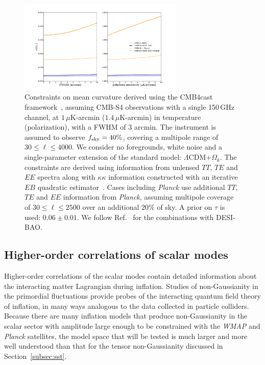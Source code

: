 \begin{figure}[h!]
\centering \includegraphics[width=0.70\textwidth]{Inflation/OmK_vs_FWHM_or_uK_arcmin.pdf}
\caption{Constraints on mean curvature derived using the CMB4cast framework~\cite{Errard:2015cxa}, assuming CMB-S4 observations with a single 150\,GHz channel, at $1\,\mu$K-arcmin ($1.4\,\mu$K-arcmin) in temperature (polarization), with a FWHM of 3 arcmin. The instrument is assumed to observe $f_{\rm sky} = 40\%$, covering a multipole range of $30\leq\ell\leq 4000$.
We consider no foregrounds, white noise and a single-parameter extension of the standard model: $\Lambda$CDM+$\Omega_k$. 
The constraints are derived using information from unlensed $TT$, $TE$ and $EE$ spectra along with $\kappa\kappa$ information constructed with an iterative $EB$ quadratic estimator~\cite{Hirata:2002jy,Smith:2010gu}. Cases including {\it Planck\/} use additional $TT$, $TE$ and $EE$ information from {\it Planck}, assuming multipole coverage of $30\leq\ell\leq 2500$ over an additional $20\%$ of sky. A prior on $\tau$ is used: $0.06\pm0.01$. We follow Ref.~\cite{Wu:2014hta} for the combinations with DESI-BAO.}
\label{fig:OmK_vs_FWHM_or_uK_arcmin}
\end{figure}


\subsection{Higher-order correlations of scalar modes}
\label{subsec:scalarNG}
Higher-order correlations of the scalar modes contain detailed information about the interacting matter Lagrangian during inflation. Studies of non-Gaussianity in the primordial fluctuations provide probes of the interacting quantum field theory of inflation, in many ways analogous to the data collected in particle colliders. Because there are many inflation models that produce non-Gaussianity in the scalar sector with amplitude large enough to be constrained with the {\it WMAP\/} and {\it Planck\/} satellites, the model space that will be tested is much larger and  more well understood than that for the tensor non-Gaussianity discussed in Section~\ref{subsec:sst}.

